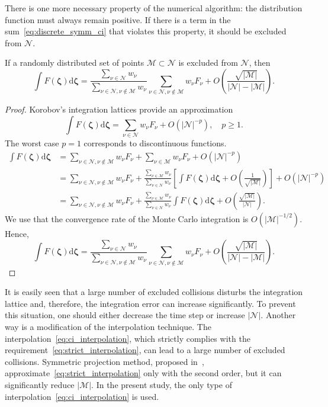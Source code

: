 \documentclass[final]{jfm} %
\newcommand{\dd}{\mathrm{d}}
\newcommand{\dzeta}{\boldsymbol{\dd\zeta}}
\newcommand{\bzeta}{\boldsymbol{\zeta}}
\newcommand{\Nu}{\mathcal{N}}
\newcommand{\Mu}{\mathcal{M}}
\newcommand{\OO}[1]{O\left(#1\right)}
\begin{document}
There is one more necessary property of the numerical algorithm:
the distribution function must always remain positive.
If there is a term in the sum~\eqref{eq:discrete_symm_ci} that violates this property,
it should be excluded from \(\Nu\).
\begin{lemma}
    If a randomly distributed set of points \(\Mu\subset\Nu\) is excluded from \(\Nu\), then
    \begin{equation*}
        \int F(\bzeta) \dzeta = \frac{\sum_{\nu\in\Nu} w_\nu}{\sum_{\nu\in\Nu,\nu\notin\Mu} w_\nu}
            \sum_{\nu\in\Nu,\nu\notin\Mu} w_\nu F_\nu + \OO{\frac{\sqrt{|\Mu|}}{|\Nu|-|\Mu|}}.
    \end{equation*}
\end{lemma}

\begin{proof}

Korobov's integration lattices provide an approximation
\begin{equation*}
    \int F(\bzeta) \dzeta = \sum_{\nu\in\Nu} w_\nu F_\nu + \OO{|\Nu|^{-p}}, \quad p\geq1.
\end{equation*}
The worst case \(p=1\) corresponds to discontinuous functions.
\begin{align*}
    \int F(\bzeta) \dzeta &= \sum_{\nu\in\Nu,\nu\notin\Mu} w_\nu F_\nu
        + \sum_{\nu\in\Mu} w_\nu F_\nu + \OO{|\Nu|^{-p}} \\
    &= \sum_{\nu\in\Nu,\nu\notin\Mu} w_\nu F_\nu
        + \frac{\sum_{\nu\in\Mu} w_\nu}{\sum_{\nu\in\Nu} w_\nu}
             \left[ \int F(\bzeta) \dzeta + \OO{\frac1{\sqrt{|\Mu|}}} \right]
        + \OO{|\Nu|^{-p}} \\
    &= \sum_{\nu\in\Nu,\nu\notin\Mu} w_\nu F_\nu
        + \frac{\sum_{\nu\in\Mu} w_\nu}{\sum_{\nu\in\Nu} w_\nu} \int F(\bzeta) \dzeta
        + \OO{\frac{\sqrt{|\Mu|}}{|\Nu|}}.
\end{align*}
We use that the convergence rate of the Monte Carlo integration is \(\OO{|\Mu|^{-1/2}}\). Hence,
\begin{equation*}
    \int F(\bzeta) \dzeta = \frac{\sum_{\nu\in\Nu} w_\nu}{\sum_{\nu\in\Nu,\nu\notin\Mu} w_\nu}
        \sum_{\nu\in\Nu,\nu\notin\Mu} w_\nu F_\nu + \OO{\frac{\sqrt{|\Mu|}}{|\Nu|-|\Mu|}}.
\end{equation*}

\end{proof}

It is easily seen that a large number of excluded collisions disturbs the integration lattice
and, therefore, the integration error can increase significantly.
To prevent this situation, one should either decrease the time step or increase \(|\Nu|\).
Another way is a modification of the interpolation technique.
The interpolation~\eqref{eq:ci_interpolation},
which strictly complies with the requirement~\eqref{eq:strict_interpolation},
can lead to a large number of excluded collisions.
Symmetric projection method, proposed in~\citet{Tcheremissine2015},
approximate~\eqref{eq:strict_interpolation} only with the second order,
but it can significantly reduce \(|\Mu|\).
In the present study, the only type of interpolation~\eqref{eq:ci_interpolation} is used.
\end{document}
